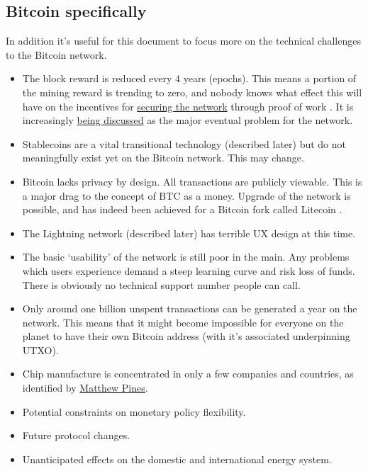\subsection{Bitcoin specifically}
\noindent In addition it's useful for this document to focus more on the technical challenges to the Bitcoin network.\par
\begin{itemize}
\item The block reward is reduced every 4 years (epochs). This means a portion of the mining reward is trending to zero, and nobody knows what effect this will have on the incentives for \href{https://www.truthcoin.info/blog/security-budget-ii-mm/}{securing the network} through proof of work \cite{carlsten2016instability}. It is increasingly \href{https://cryptostackers.substack.com/p/bitcoin-is-not-a-store-of-value?sd=pf&s=r}{being discussed} as the major eventual problem for the network.
\item Stablecoins are a vital transitional technology (described later) but do not meaningfully exist yet on the Bitcoin network. This may change.
\item Bitcoin lacks privacy by design. All transactions are publicly viewable. This is a major drag to the concept of BTC as a money. Upgrade of the network is possible, and has indeed been achieved for a Bitcoin fork called Litecoin \cite{fuchsbauer2019aggregate}. 
\item The Lightning network (described later) has terrible UX design at this time. 
\item The basic `usability' of the network is still poor in the main. Any problems which users experience demand a steep learning curve and risk loss of funds. There is obviously no technical support number people can call. 
\item Only around one billion unspent transactions can be generated a year on the network. This means that it might become impossible for everyone on the planet to have their own Bitcoin address (with it's associated underpinning UTXO).  
\item Chip manufacture is concentrated in only a few companies and countries, as identified by \href{https://www.btcpolicy.org/authors/matthew-pines}{Matthew Pines}. %
\item Potential constraints on monetary policy flexibility.
\item Future protocol changes.
\item Unanticipated effects on the domestic and international energy system.

\end{itemize}
